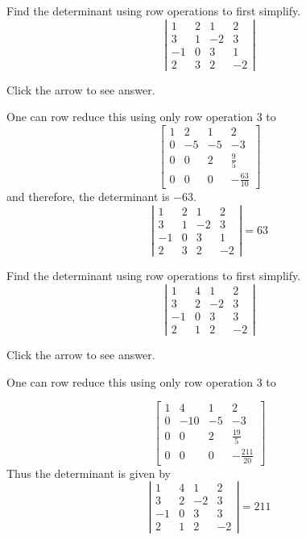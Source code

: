 \documentclass{ximera}
\begin{document}
\begin{problem}\label{prb:7.24} Find the determinant using row operations to first simplify.
\begin{equation*}
\left|
\begin{array}{rrrr}
1 & 2 & 1 & 2 \\
3 & 1 & -2 & 3 \\
-1 & 0 & 3 & 1 \\
2 & 3 & 2 & -2
\end{array}
\right|
\end{equation*}

Click the arrow to see answer.
\begin{expandable}
One can row reduce this using only row operation 3 to
\[
\left[
\begin{array}{rrrr}
1 & 2 & 1 & 2 \\
0 & -5 & -5 & -3 \\
0 & 0 & 2 & \frac{9}{5} \\
0 & 0 & 0 & -\frac{63}{10}
\end{array}
\right]
\]
and therefore, the determinant is $-63.$
\[
\left|
\begin{array}{rrrr}
1 & 2 & 1 & 2 \\
3 & 1 & -2 & 3 \\
-1 & 0 & 3 & 1 \\
2 & 3 & 2 & -2
\end{array}
\right| = 63
\]
\end{expandable}
\end{problem}

\begin{problem}\label{prb:7.25} Find the determinant using row operations to first simplify.
\begin{equation*}
\left|
\begin{array}{rrrr}
1 & 4 & 1 & 2 \\
3 & 2 & -2 & 3 \\
-1 & 0 & 3 & 3 \\
2 & 1 & 2 & -2
\end{array}
\right|
\end{equation*}

Click the arrow to see answer.
\begin{expandable}
One can row reduce this using only row operation 3 to

\[
\left[
\begin{array}{rrrr}
1 & 4 & 1 & 2 \\
0 & -10 & -5 & -3 \\
0 & 0 & 2 & \frac{19}{5} \\
0 & 0 & 0 & -\frac{211}{20}
\end{array}
\right]
\]
Thus the determinant is given by
\[
\left|
\begin{array}{rrrr}
1 & 4 & 1 & 2 \\
3 & 2 & -2 & 3 \\
-1 & 0 & 3 & 3 \\
2 & 1 & 2 & -2
\end{array}
\right| = 211
\]
\end{expandable}
\end{problem}
\end{document}
